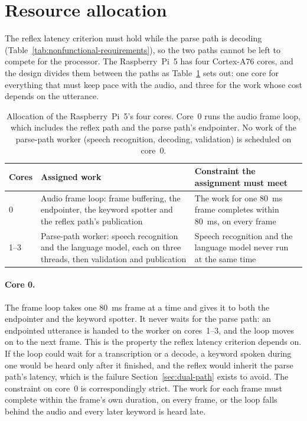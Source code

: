 \clearpage
\section{Resource allocation}
\label{sec:resource-allocation}
The reflex latency criterion must hold while the parse path is decoding
(Table~\ref{tab:nonfunctional-requirements}), so the two paths cannot be left to compete for the
processor. The Raspberry~Pi~5 has four Cortex-A76 cores, and the design divides them between the
paths as Table~\ref{tab:core-allocation} sets out: one core for everything that must keep pace with
the audio, and three for the work whose cost depends on the utterance.

\begin{table}[htbp]
\centering
\footnotesize
\caption[Core allocation]{Allocation of the Raspberry~Pi~5's four cores. Core~0 runs the audio
frame loop, which includes the reflex path and the parse path's endpointer. No work of the
parse-path worker (speech recognition, decoding, validation) is scheduled on core~0.}
\label{tab:core-allocation}
\begin{tabularx}{\textwidth}{@{}l X X@{}}
\toprule
Cores & Assigned work & Constraint the assignment must meet \\
\midrule
0 & Audio frame loop: frame buffering, the endpointer, the keyword spotter and the reflex path's publication & The work for one 80~ms frame completes within 80~ms, on every frame \\
1--3 & Parse-path worker: speech recognition and the language model, each on three threads, then validation and publication & Speech recognition and the language model never run at the same time \\
\bottomrule
\end{tabularx}
\end{table}

\paragraph{Core 0.} The frame loop takes one 80~ms frame at a time and gives it to both the
endpointer and the keyword spotter. It never waits for the parse path: an endpointed utterance is
handed to the worker on cores~1--3, and the loop moves on to the next frame. This is the property
the reflex latency criterion depends on. If the loop could wait for a transcription or a decode, a
keyword spoken during one would be heard only after it finished, and the reflex would inherit the
parse path's latency, which is the failure Section~\ref{sec:dual-path} exists to avoid. The
constraint on core~0 is correspondingly strict. The work for each frame must complete within the
frame's own duration, on every frame, or the loop falls behind the audio and every later keyword is
heard late.


